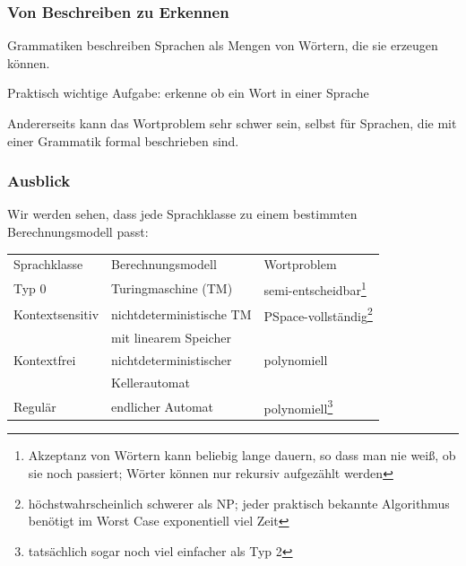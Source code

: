 \documentclass[onlymath]{beamer}
\begin{document}


\begin{frame}\frametitle{Von Beschreiben zu Erkennen}

Grammatiken beschreiben Sprachen als Mengen von Wörtern, die sie \alert{erzeugen} können.
\medskip

Praktisch wichtige Aufgabe: \alert{erkenne} ob ein Wort in einer Sprache 

\pause


Andererseits kann das Wortproblem sehr schwer sein, selbst für Sprachen, die mit einer Grammatik formal beschrieben sind.

\end{frame}

\begin{frame}\frametitle{Ausblick}

Wir werden sehen, dass jede Sprachklasse zu einem bestimmten Berechnungsmodell passt:
\bigskip

\begin{tabular}{@{}lll@{}}
\alert{Sprachklasse} & \alert{Berechnungsmodell} & \alert{Wortproblem}\\
Typ 0 & Turingmaschine (TM) & semi-entscheidbar\footnote{Akzeptanz von Wörtern kann beliebig lange dauern, so dass man nie weiß, ob sie noch passiert; Wörter können nur rekursiv aufgezählt werden}\\
Kontextsensitiv & nichtdeterministische TM & PSpace-vollständig\footnote{höchstwahrscheinlich schwerer als NP; jeder praktisch bekannte Algorithmus benötigt im Worst Case exponentiell viel Zeit}\\[-1ex]
	&  mit linearem Speicher & \\
Kontextfrei & nichtdeterministischer & polynomiell\\[-1ex]
	&  Kellerautomat & \\
Regulär & endlicher Automat & polynomiell\footnote{tatsächlich sogar noch viel einfacher als Typ 2}
\end{tabular}
% 

\end{frame}
\end{document}
